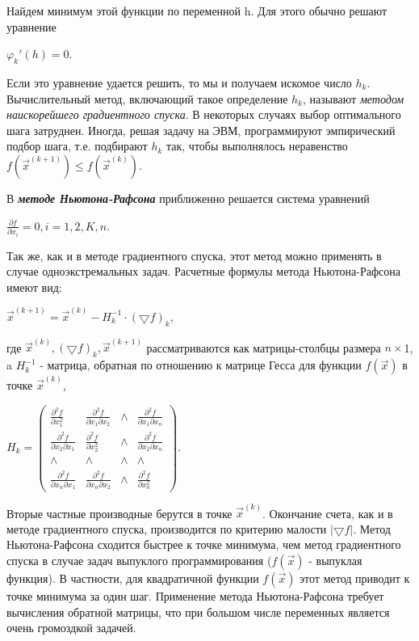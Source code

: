 {Найдем минимум этой функции по переменной h. Для этого обычно решают уравнение
\begin{center}
	${\varphi_{k}}'(h)=0.$
\end{center}

Если это уравнение удается решить, то мы и получаем искомое число $h_{k}$. Вычислительный метод,  включающий такое определение $h_{k}$, называют \textit{методом наискорейшего градиентного спуска}. В некоторых случаях выбор оптимального шага затруднен. Иногда, решая задачу на ЭВМ, программируют эмпирический подбор шага, т.е. подбирают $h_{k}$ так, чтобы выполнялось неравенство $f(\vec{x}^{(k+1)})\leq f(\vec{x}^{(k)})$.

В \textbf{\textit{методе Ньютона-Рафсона }} приближенно решается система уравнений
\begin{center}
	$\frac{\partial f}{\partial x_{i}} = 0, i=1, 2, K, n.$
\end{center}
Так же, как и в методе градиентного спуска, этот метод можно применять в случае одноэкстремальных задач. Расчетные формулы метода Ньютона-Рафсона имеют вид:

\begin{center}
	$\vec{x}^{(k+1)}=\vec{x}^{(k)}-H_{k}^{-1}\cdot (\bigtriangledown f)_{k},$
\end{center}
где $\vec{x}^{(k)}, (\bigtriangledown f)_{k},\vec{x}^{(k+1)}$ рассматриваются как матрицы-столбцы размера $n \times$1, a $H_{k}^{-1}$ - матрица, обратная по отношению к матрице Гесса для функции $f(\vec{x})$ в точке $\vec{x}^{(k)}$,
\begin{center}
	$H_{k}=\begin{pmatrix}
	\frac{\partial^{2}f}{\partial x_{1}^{2}}& \frac{\partial^{2}f}{\partial x_{1} \partial x_{2}} & \wedge  & \frac{\partial^{2}f}{\partial x_{1} \partial x_{n}}\\
	\frac{\partial^{2}f}{\partial x_{2} \partial x_{1}}& \frac{\partial^{2}f}{\partial x_{2}^{2}} & \wedge  & \frac{\partial^{2}f}{\partial x_{2} \partial x_{n}}\\
	\wedge & \wedge & \wedge & \wedge \\
	\frac{\partial^{2}f}{\partial x_{n} \partial x_{1}}& \frac{\partial^{2}f}{\partial x_{n} \partial x_{2}} & \wedge  & \frac{\partial^{2}f}{\partial x_{n}^{2} }
	\end{pmatrix}.$
\end{center}

Вторые частные производные берутся в точке $\vec{x}^{(k)}$. Окончание счета, как и в методе градиентного спуска, производится по критерию малости  $\left |\bigtriangledown f  \right |$. Метод Ньютона-Рафсона сходится быстрее к точке минимума, чем метод градиентного спуска в случае задач  выпуклого  программирования ($f(\vec{x})$ - выпуклая функция). В частности, для квадратичной функции  $f(\vec{x})$ этот метод приводит к точке минимума за один шаг. Применение метода Ньютона-Рафсона требует  вычисления обратной  матрицы, что при большом числе переменных является очень громоздкой задачей.

}
